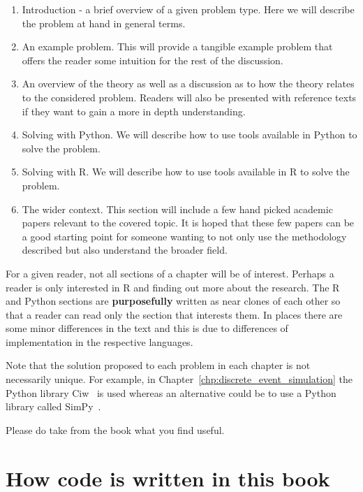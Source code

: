 \begin{enumerate}
\item
  Introduction - a brief overview of a given problem type. Here we will
  describe the problem at hand in general terms.
\item
  An example problem. This will provide a tangible example problem that
  offers the reader some intuition for the rest of the discussion.
\item
  An overview of the theory as well as a discussion as to how the theory relates
  to the considered problem. Readers will also be presented with reference
  texts if they want to gain a more in depth understanding.
\item
  Solving with Python. We will describe how to use tools available
  in Python to solve the problem.
\item
  Solving with R. We will describe how to use tools available
  in R to solve the problem.
\item
  The wider context. This section will include a few hand picked academic papers
  relevant to the covered topic. It is hoped that these few papers can be a good
  starting point for someone wanting to not only use the methodology described
  but also understand the broader field.
\end{enumerate}

For a given reader, not all sections of a chapter will be of interest.
Perhaps a reader is only interested in R and finding out more about the
research.
The R and Python sections are \textbf{purposefully} written as near clones of
each other so that a reader can read only the section that interests them.
In places there are some minor differences in the text and this is due to
differences of implementation in the respective languages.

Note that the solution proposed to each problem in each chapter is not
necessarily unique. For example, in Chapter~\ref{chp:discrete_event_simulation}
the Python library Ciw~\cite{ciwpython, palmer2019ciw}
is used whereas an alternative could be to use a Python
library called SimPy~\cite{simpy}.

Please do take from the book what you find useful.

\section{How code is written in this book}\label{sec:how-code-is-written-in-this-book}

